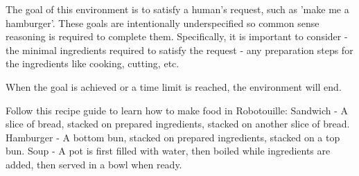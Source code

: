 The goal of this environment is to satisfy a human's request, such as 'make me a hamburger'. These goals are intentionally underspecified so common sense reasoning is required to complete them. Specifically, it is important to consider
    - the minimal ingredients required to satisfy the request
    - any preparation steps for the ingredients like cooking, cutting, etc.

When the goal is achieved or a time limit is reached, the environment will end.

Follow this recipe guide to learn how to make food in Robotouille:
    Sandwich - A slice of bread, stacked on prepared ingredients, stacked on another slice of bread.
    Hamburger - A bottom bun, stacked on prepared ingredients, stacked on a top bun.
    Soup - A pot is first filled with water, then boiled while ingredients are added, then served in a bowl when ready.
